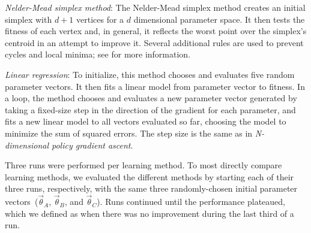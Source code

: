
\emph{Nelder-Mead simplex method}: The Nelder-Mead simplex
  method creates an initial simplex with $d+1$ vertices
  for a $d$ dimensional parameter space. It then tests the
  fitness of each vertex and, in general, it reflects the worst point
  over the simplex's centroid in an attempt to improve it.  Several additional
  rules are used to prevent cycles and local minima; see \cite{nm} for more information.

\emph{Linear regression}: To initialize, this method chooses and
  evaluates five random parameter vectors. It then fits a linear model
  from parameter vector to fitness. In a loop, the method chooses and
  evaluates a new parameter vector generated by taking a fixed-size
  step in the direction of the gradient for each parameter, and fits a
  new linear model to all vectors evaluated so far, choosing the model
  to minimize the sum of squared errors. The step size is the same as in
  \emph{N-dimensional policy gradient ascent}.

Three runs were performed per learning method. To most directly compare learning methods, we
evaluated the different methods by starting each of their three runs, respectively, with the same three randomly-chosen initial parameter vectors~($\vec{\theta}_A$,
$\vec{\theta}_B$, and $\vec{\theta}_C$). Runs continued until the performance plateaued, which we defined as when there was no improvement during the last third of
a run.

